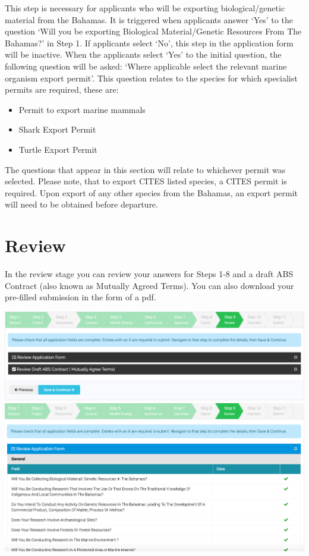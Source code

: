 \documentclass[
]{book}
\providecommand{\tightlist}{%
  \setlength{\itemsep}{0pt}\setlength{\parskip}{0pt}}
\begin{document}
This step is necessary for applicants who will be exporting biological/genetic material from the Bahamas. It is triggered when applicants answer `Yes' to the question `Will you be exporting Biological Material/Genetic Resources From The Bahamas?' in Step 1. If applicants select `No', this step in the application form will be inactive. When the applicants select `Yes' to the initial question, the following question will be asked: `Where applicable select the relevant marine organism export permit'. This question relates to the species for which specialist permits are required, these are:

\begin{itemize}
\tightlist
\item
  Permit to export marine mammals
\item
  Shark Export Permit
\item
  Turtle Export Permit
\end{itemize}

The questions that appear in this section will relate to whichever permit was selected. Please note, that to export CITES listed species, a CITES permit is required. Upon export of any other species from the Bahamas, an export permit will need to be obtained before departure.

\hypertarget{review}{%
\chapter{Review}\label{review}}

In the review stage you can review your answers for Steps 1-8 and a draft ABS Contract (also known as Mutually Agreed Terms). You can also download your pre-filled submission in the form of a pdf.

\includegraphics{images/review.png}
\includegraphics{images/review_application_form.png}
\end{document}

